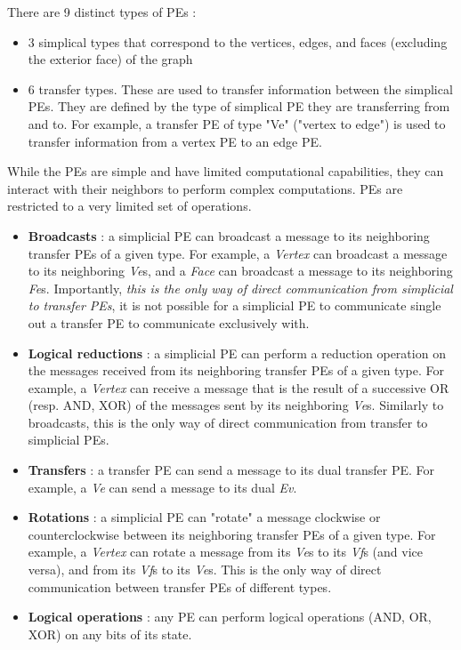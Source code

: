 \documentclass[11pt,a4paper]{report}
\begin{document}
There are 9 distinct types of PEs : 
\begin{itemize}
    \item 3 simplical types that correspond to the vertices, edges, and faces (excluding the exterior face) of the graph
    \item 6 transfer types. These are used to transfer information between the simplical PEs. They are defined by the type of simplical PE they are transferring from and to. For example, a transfer PE of type "Ve" ("vertex to edge") is used to transfer information from a vertex PE to an edge PE.
\end{itemize}

While the PEs are simple and have limited computational capabilities, they can interact with their neighbors to perform complex computations. PEs are restricted to a very limited set of operations. 
\begin{itemize}
    \item \textbf{Broadcasts} : a simplicial PE can broadcast a message to its neighboring transfer PEs of a given type. For example, a \textit{Vertex} can broadcast a message to its neighboring \textit{Ve}s, and a \textit{Face} can broadcast a message to its neighboring \textit{Fe}s. Importantly, \textit{this is the only way of direct communication from simplicial to transfer PEs}, it is not possible for a simplicial PE to communicate single out a transfer PE to communicate exclusively with.
    
    \item \textbf{Logical reductions} : a simplicial PE can perform a reduction operation on the messages received from its neighboring transfer PEs of a given type. For example, a \textit{Vertex} can receive a message that is the result of a successive OR (resp. AND, XOR) of the messages sent by its neighboring \textit{Ve}s. Similarly to broadcasts, this is the only way of direct communication from transfer to simplicial PEs.
    
    \item \textbf{Transfers} : a transfer PE can send a message to its dual transfer PE. For example, a \textit{Ve} can send a message to its dual \textit{Ev}.
    
    \item \textbf{Rotations} : a simplicial PE can "rotate" a message clockwise or counterclockwise between its neighboring transfer PEs of a given type. For example, a \textit{Vertex} can rotate a message from its \textit{Ve}s to its \textit{Vf}s (and vice versa), and from its \textit{Vf}s to its \textit{Ve}s. This is the only way of direct communication between transfer PEs of different types.
    
    \item \textbf{Logical operations} : any PE can perform logical operations (AND, OR, XOR) on any bits of its state.
\end{itemize}
\end{document}
